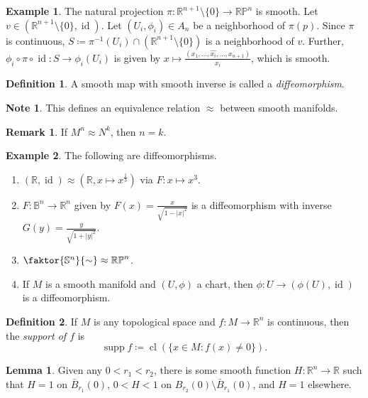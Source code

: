 \documentclass[10pt,letterpaper,cm]{nupset}
\theoremstyle{definition}
\newtheorem*{definition}{Definition}
\newtheorem{exmp}{Example}
\newtheorem{remark}{Remark}
\newtheorem{lemma}{Lemma}
\newtheorem*{note}{Note}
\newcommand{\R}{\mathbb R}
\newcommand{\RP}{\mathbb{RP}}
\renewcommand{\S}{\mathbb S}
\newcommand{\B}{\mathbb{B}}
\newcommand{\1}{\mathbf{1}}
\newcommand{\0}{\vec 0}
\DeclareMathOperator{\id}{id}
\DeclareMathOperator{\supp}{supp}
\DeclareMathOperator{\cl}{cl}
\begin{document}
\begin{exmp}
The natural projection $\pi : \R^{n+1}\setminus \{0\} \to \RP^n$ is smooth. Let $v \in (\R^{n+1} \setminus \{0\}, \id)$. Let $(U_i, \phi_i) \in A_n$ be a neighborhood of $\pi(p)$. Since $\pi$ is continuous, $S \coloneqq  \pi^{-1}(U_i) \cap  (\R^{n+1} \setminus \{0\})$ is a neighborhood of $v$. Further, $\phi_i \circ \pi \circ \id : S \to \phi_i(U_i)$ is given by $x\mapsto \frac{(x_1, \ldots, \widehat{x_i}, \ldots, x_{n+1})}{x_i}$, which is smooth.
\end{exmp}

\begin{definition} A smooth map with smooth inverse is called a \textit{diffeomorphism}.
\begin{note} This defines an equivalence relation $\approx$ between smooth manifolds. \end{note}
\end{definition}

\begin{remark} If $M^n \approx N^k$, then $n =k$.
\end{remark}

\begin{exmp}{The following are diffeomorphisms.}
\begin{enumerate}
\item $(\R, \id) \approx (\R, x\mapsto x^{\frac{1}{3}})$ via $F: x \mapsto x^3$.
\item $F: \B^n \to \R^n$ given by $F(x) = \frac{x}{\sqrt{1-|x|^2}}$ is a diffeomorphism with inverse $G(y) = \frac{y}{\sqrt{1+|y|^2}}$.
\item  $\faktor{\S^n}{\sim} \approx \RP^n$.
\item If $M$ is a smooth manifold and $(U, \phi)$ a chart, then $\phi: U \to (\phi(U), \id)$ is a diffeomorphism.

\end{enumerate}
\end{exmp}

\begin{definition}
If $M$ is any topological space and $f:M \to \R^n$ is continuous, then the \textit{support of $f$} is $$\supp f \coloneqq  \cl(\{x \in M: f(x) \ne 0\}).$$
\end{definition}

\begin{lemma}
Given any $0<r_1<r_2$, there is some smooth function $H: \R^n \to \R$ such that $H =1$ on $\bar{B}_{r_1}(0)$, $0<H <1$ on $B_{r_2}(0)\setminus \bar{B}_{r_1}(0)$, and $H=1$ elsewhere. 
\end{lemma}
\end{document}
